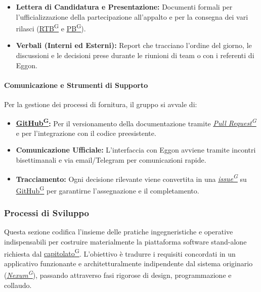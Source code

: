 \documentclass[a4paper,12pt]{article}
\providecommand{\glslink}[2]{\href{https://alittlebyte-19.github.io/Documentazione/glossario.html\#gls-#1}{\underline{#2}\textsuperscript{\scriptsize G}}}
\begin{document}
\begin{itemize}
    \item \textbf{Lettera di Candidatura e Presentazione:}  Documenti formali per l'ufficializzazione della partecipazione all'appalto e per la consegna dei vari rilasci (\glslink{rtb-requirements-and-technology-baseline}{RTB} e \glslink{pb-product-baseline}{PB}).
    \item \textbf{Verbali (Interni ed Esterni):} Report che tracciano l'ordine del giorno, le discussioni e le decisioni prese durante le riunioni di team o con i referenti di Eggon.
\end{itemize}

\paragraph{Comunicazione e Strumenti di Supporto}
Per la gestione dei processi di fornitura, il gruppo si avvale di:

\begin{itemize}
    \item \textbf{\glslink{github}{GitHub}:} Per il versionamento della documentazione tramite \textit{\glslink{pull-request}{Pull Request}} e per l'integrazione con il codice preesistente.
    \item \textbf{Comunicazione Ufficiale:} L'interfaccia con Eggon avviene tramite incontri bisettimanali e via email/Telegram per comunicazioni rapide.
    \item \textbf{Tracciamento:} Ogni decisione rilevante viene convertita in una \textit{\glslink{issue}{issue}} su \glslink{github}{GitHub} per garantirne l'assegnazione e il completamento.
\end{itemize}

\subsubsection{Processi di Sviluppo}
Questa sezione codifica l'insieme delle pratiche ingegneristiche e operative indispensabili per costruire materialmente la piattaforma software stand-alone richiesta dal \glslink{capitolato}{capitolato}. L'obiettivo è tradurre i requisiti concordati in un applicativo funzionante e architetturalmente indipendente dal sistema originario (\textit{\glslink{nexum}{Nexum}}), passando attraverso fasi rigorose di design, programmazione e collaudo.
\end{document}
